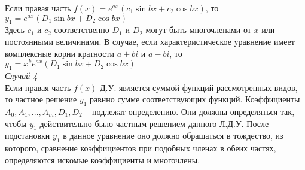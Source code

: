\documentclass{article}
\numberwithin{equation}{section}
\begin{document}
Если правая часть $f(x)=e^{ax}(c_1\sin bx+c_2\cos bx)$, то $y_1=e^{ax}(D_1\sin bx+D_2\cos bx)$\\
Здесь $c_1$ и $c_2$ соответственно $D_1$ и $D_2$ могут быть многочленами от $x$ или постоянными величинами. В случае, если характеристическое уравнение имеет комплексные корни кратности $a+bi$ и $a-bi$, то $y_1=x^ke^{ax}(D_1\sin bx+D_2\cos bx)$\\
\textit{Случай 4}\\
Если правая часть $f(x)$ Д.У. является суммой функций рассмотренных видов, то частное решение $y_1$ равнно сумме соответствующих функций. Коэффициенты $A_0,A_1,...,A_m,D_1,D_2$ -- подлежат определению. Они должны определяться так, чтобы $y_1$ действительно было частным решением данного Л.Д.У. После подстановки $y_1$ в данное уравнение оно должно обращаться в тождество, из которого, сравнение коэффициентов при подобных членах в обеих частях, определяются искомые коэффициенты и многочлены.
\end{document}

